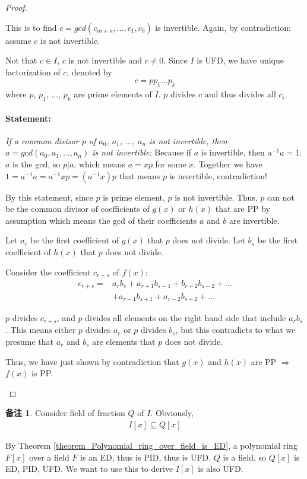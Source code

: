 \documentclass[utf8]{ctexbook}
\theoremstyle{definition}
\newtheorem{memo}{备注}[section]
\begin{document}
\begin{proof}
\begin{enumerate}
{This is to find $c = gcd(c_{m+n}, \ldots, c_1, c_0)$ is invertible. Again, by contradiction: assume $c$ is not invertible. 

Not that $c \in I$, $c$ is not invertible and $c \neq 0$. Since $I$ is UFD, we have unique factorization of $c$, denoted by
\begin{align*}
c = p p_1 \ldots p_k
\end{align*} 
where $p$, $p_1$, $\ldots$, $p_k$ are prime elements of $I$. $p$ divides $c$ and thus divides all $c_i$. 

\paragraph{Statement:} \emph{If a common divisor $p$ of $a_0$, $a_1$, $\ldots$, $a_n$ is not invertible, then $a = gcd(a_0, a_1, \ldots, a_n)$ is not invertible:} Because
if $a$ is invertible, then $a^{-1}a = 1$. $a$ is the gcd, so $p | a$, which means $a = xp$ for some $x$. Together we have $1 =  a^{-1} a = a^{-1} x p = (a^{-1}x ) p$ that means $p$ is invertible, contradiction!

By this statement, since $p$ is prime element, $p$ is not invertible. Thus, $p$ can not be the common divisor of coefficients of $g(x)$ or $h(x)$ that are PP by assumption which means the gcd of their coefficients $a$ and $b$ are invertible.

Let $a_r$ be the first coefficient of $g(x)$ that $p$ does not divide. Let $b_s$ be the first coefficient of $h(x)$ that $p$ does not divide.

Consider the coefficient $c_{r+s}$ of $f(x)$:
\begin{align*}
c_{r+s} = & a_r b_s + a_{r+1} b_{s-1} + b_{r+2} b_{s-2} + \ldots \\
 & + a_{r-1} b_{s+1} + a_{r-2} b_{s+2} + \ldots
\end{align*}

$p$ divides $c_{r+s}$, and $p$ divides all elements on the right hand side that include $a_r b_s$. This means either $p$ divides $a_r$ or $p$ divides $b_s$, but this contradicts to what we presume that $a_r$ and $b_s$ are elements that $p$ does not divide.

Thus, we have just shown by contradiction that $g(x)$ and $h(x)$ are PP $\Longrightarrow$ $f(x)$ is PP.
}
\end{enumerate}
\end{proof}


\begin{memo}
Consider field of fraction $Q$ of $I$. Obviously,
\begin{align*}
I[x] \subseteq Q[x]
\end{align*}

By Theorem \ref{theorem_Polynomial_ring_over_field_is_ED}, a polynomial ring $F[x]$ over a field $F$ is an ED, thus is PID, thus is UFD. $Q$ is a field, so $Q[x]$ is ED, PID, UFD. We want to use this to derive $I[x]$ is also UFD.

\end{memo}
\end{document}
